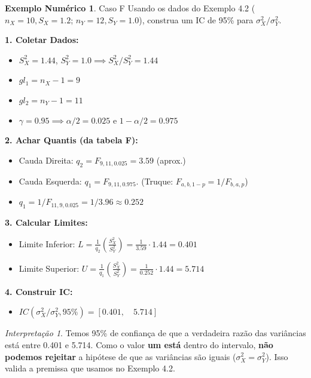 \documentclass[12pt, a4paper]{article}
\theoremstyle{definition} %
\newtheorem{exemplo}{Exemplo Numérico}[section]
\theoremstyle{remark} %
\newtheorem{interpretacao}{Interpretação}[section]
\begin{document}
\begin{exemplo}{Caso F}
    Usando os dados do Exemplo 4.2 ($n_X=10, S_X=1.2$; $n_Y=12, S_Y=1.0$), construa um IC de 95\% para $\sigma_X^2 / \sigma_Y^2$.

    \textbf{1. Coletar Dados:}
    \begin{itemize}
        \item $S_X^2 = 1.44$, $S_Y^2 = 1.0 \implies S_X^2 / S_Y^2 = 1.44$
        \item $gl_1 = n_X - 1 = 9$
        \item $gl_2 = n_Y - 1 = 11$
        \item $\gamma = 0.95 \implies \alpha/2 = 0.025$ e $1-\alpha/2 = 0.975$
    \end{itemize}
    \textbf{2. Achar Quantis (da tabela F):}
    \begin{itemize}
        \item Cauda Direita: $q_2 = F_{9, 11, 0.025} = 3.59$ (aprox.)
        \item Cauda Esquerda: $q_1 = F_{9, 11, 0.975}$. (Truque: $F_{a,b, 1-p} = 1 / F_{b,a, p}$)
        \item $q_1 = 1 / F_{11, 9, 0.025} = 1 / 3.96 \approx 0.252$
    \end{itemize}
    \textbf{3. Calcular Limites:}
    \begin{itemize}
        \item Limite Inferior: $L = \frac{1}{q_2} \left(\frac{S_X^2}{S_Y^2}\right) = \frac{1}{3.59} \cdot 1.44 = 0.401$
        \item Limite Superior: $U = \frac{1}{q_1} \left(\frac{S_X^2}{S_Y^2}\right) = \frac{1}{0.252} \cdot 1.44 = 5.714$
    \end{itemize}
    \textbf{4. Construir IC:}
    \begin{itemize}
        \item $IC(\sigma_X^2 / \sigma_Y^2, 95\%) = [0.401, \quad 5.714]$
    \end{itemize}
    \begin{interpretacao}
        Temos 95\% de confiança de que a verdadeira razão das variâncias está entre 0.401 e 5.714. Como o valor \textbf{um está} dentro do intervalo, \textbf{não podemos rejeitar} a hipótese de que as variâncias são iguais ($\sigma_X^2 = \sigma_Y^2$). Isso valida a premissa que usamos no Exemplo 4.2.
    \end{interpretacao}
\end{exemplo}

\newpage
\end{document}
